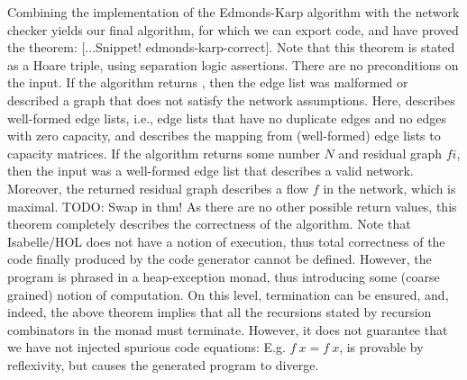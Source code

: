 \documentclass{llncs}
\begin{document}
  Combining the implementation of the Edmonds-Karp algorithm with the network checker yields our final algorithm,
  for which we can export code, and have proved the theorem: [...Snippet! edmonds-karp-correct]. 
  Note that this theorem is stated as a Hoare triple, using separation logic assertions. There are no preconditions on the input.
  If the algorithm returns , then the edge list was malformed or described a graph that does not satisfy the network assumptions.
  Here,  describes well-formed edge lists, i.e., edge lists that have no duplicate edges and no edges with zero capacity,
  and  describes the mapping from (well-formed) edge lists to capacity matrices.
  If the algorithm returns some number $N$ and residual graph $fi$, then the input was a well-formed edge list that describes a valid network.
  Moreover, the returned residual graph describes a flow $f$ in the network, which is maximal. TODO: Swap in thm!
  As there are no other possible return values, this theorem completely describes the correctness of the algorithm. 
  Note that Isabelle/HOL does not have a notion of execution, thus total correctness of the code finally produced by the code 
  generator cannot be defined. However, the program is phrased in a heap-exception monad, thus introducing some (coarse grained) notion of
  computation. On this level, termination can be ensured, and, indeed, the above theorem implies that all the recursions stated by recursion 
  combinators in the monad must terminate. However, it does not guarantee that we have not injected spurious code equations: E.g. $f~x = f~x$,
  is provable by reflexivity, but causes the generated program to diverge.

    
    
\end{document}

